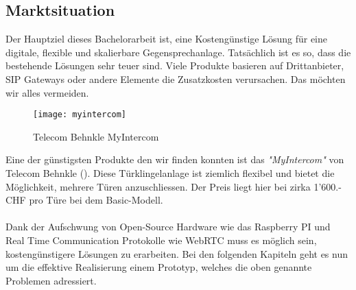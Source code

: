 \subsection{Marktsituation}
\label{sec:chapterexample}
Der Hauptziel dieses Bachelorarbeit ist, eine Kostengünstige Lösung für eine digitale, flexible und skalierbare Gegensprechanlage. Tatsächlich ist es so, dass die bestehende Lösungen sehr teuer sind. Viele Produkte basieren auf Drittanbieter, SIP Gateways oder andere Elemente die Zusatzkosten verursachen. Das möchten wir alles vermeiden.

\begin{figure}[htb!]
	\begin{center}
		\texttt{[image: myintercom]}
		\caption[Telecom Behnkle MyIntercom]{Telecom Behnkle MyIntercom}
		\label{fig:myintercom}
	\end{center}
\end{figure}

Eine der günstigsten Produkte den wir finden konnten ist das \textit{"MyIntercom"} von Telecom Behnkle (). Diese Türklingelanlage ist ziemlich flexibel und bietet die Möglichkeit, mehrere Türen anzuschliessen. Der Preis liegt hier bei zirka 1'600.- CHF pro Türe bei dem Basic-Modell.
\\
\\
 Dank der Aufschwung von Open-Source Hardware wie das Raspberry PI und Real Time Communication Protokolle wie WebRTC muss es möglich sein, kostengünstigere Lösungen zu erarbeiten. Bei den folgenden Kapiteln geht es nun um die effektive Realisierung einem Prototyp, welches die oben genannte Problemen adressiert. 

\newpage